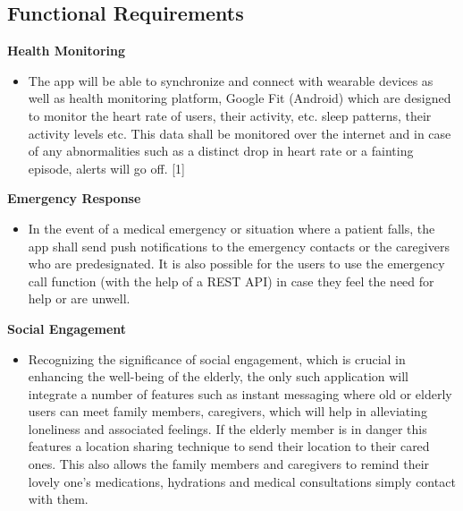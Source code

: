 \documentclass[a4paper, 12pt]{article}
\begin{document}
\subsection{Functional Requirements}
\textbf{Health Monitoring }
\begin{itemize}
    \item The app will be able to synchronize and connect with wearable devices as well as health monitoring platform, Google Fit (Android) which are designed to monitor the heart rate of users, their activity, etc. sleep patterns, their activity levels etc. This data shall be monitored over the internet and in case of any abnormalities such as a distinct drop in heart rate or a fainting episode, alerts will go off. [1]
\end{itemize}
\textbf{Emergency Response}
\begin{itemize}
    \item In the event of a medical emergency or situation where a patient falls, the app shall send push notifications to the emergency contacts or the caregivers who are predesignated. It is also possible for the users to use the emergency call function (with the help of a REST API) in case they feel the need for help or are unwell.
\end{itemize}
\textbf{Social Engagement }
\begin{itemize}
    \item Recognizing the significance of social engagement, which is crucial in enhancing the well-being of the elderly, the only such application will integrate a number of features such as instant messaging where old or elderly users can meet family members, caregivers, which will help in alleviating loneliness and associated feelings. If the elderly member is in danger this features a location sharing technique to send their location to their cared ones. This also allows the family members and caregivers to remind their lovely one’s medications, hydrations and medical consultations simply contact with them.
\end{itemize}
\end{document}

